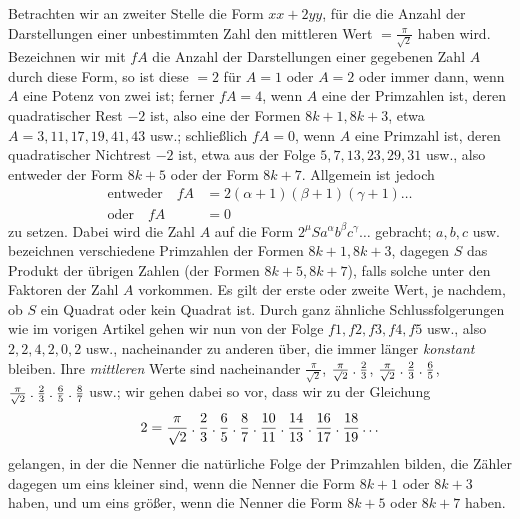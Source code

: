 \clearpage
{}
Betrachten wir an zweiter Stelle die Form $xx+2yy$, für die die Anzahl der Darstellungen einer unbestimmten Zahl den mittleren Wert $=\frac\pi{\surd2}$ haben wird. Bezeichnen wir mit $fA$ die Anzahl der Darstellungen einer gegebenen Zahl $A$ durch diese Form, so ist diese $=2$ für $A=1$ oder $A=2$ oder immer dann, wenn $A$ eine Potenz von zwei ist; ferner $fA=4$, wenn $A$ eine der Primzahlen ist, deren quadratischer Rest $-2$ ist, also eine der Formen $8k+1,8k+3$, etwa $A=3,11,17,19,41,43$ usw.; schließlich $fA=0$, wenn $A$ eine Primzahl ist, deren quadratischer Nichtrest $-2$ ist, etwa aus der Folge $5,7,13,23,29,31$ usw., also entweder der Form $8k+5$ oder der Form $8k+7$. Allgemein ist jedoch
\[
\begin{aligned}
\text{entweder}\quad fA&=2(\alpha+1)(\beta+1)(\gamma+1)\ldots\\
\text{oder}\quad fA&=0
\end{aligned}
\]
zu setzen. Dabei wird die Zahl $A$ auf die Form $2^\mu Sa^\alpha b^\beta c^\gamma\ldots$ gebracht; $a,b,c$ usw. bezeichnen verschiedene Primzahlen der Formen $8k+1,8k+3$, dagegen $S$ das Produkt der
übrigen Zahlen (der Formen $8k+5,8k+7$), falls solche unter den Faktoren der Zahl $A$ vorkommen. Es gilt der erste oder zweite Wert, je nachdem, ob $S$ ein Quadrat oder kein Quadrat ist. Durch ganz ähnliche Schlussfolgerungen wie im vorigen Artikel gehen wir nun von der Folge $f1,f2,f3,f4,f5$ usw., also $2,2,4,2,0,2$ usw., nacheinander zu anderen über, die immer länger \emph{konstant} bleiben. Ihre \emph{mittleren} Werte sind nacheinander $\frac\pi{\surd2}$, $\frac\pi{\surd2}\mathbin{.}\frac23$, $\frac\pi{\surd2}\mathbin{.}\frac23\mathbin{.}\frac65$, $\frac\pi{\surd2}\mathbin{.}\frac23\mathbin{.}\frac65\mathbin{.}\frac87$ usw.; wir gehen dabei so vor, dass wir zu der Gleichung
\[
2=\frac\pi{\surd2}\mathbin{.}\frac23\mathbin{.}\frac65\mathbin{.}\frac87\mathbin{.}\frac{10}{11}\mathbin{.}\frac{14}{13}\mathbin{.}\frac{16}{17}\mathbin{.}\frac{18}{19}\ldots
\]
gelangen, in der die Nenner die natürliche Folge der Primzahlen bilden, die Zähler dagegen um eins kleiner sind, wenn die Nenner die Form $8k+1$ oder $8k+3$ haben, und um eins größer, wenn die Nenner die Form $8k+5$ oder $8k+7$ haben.

